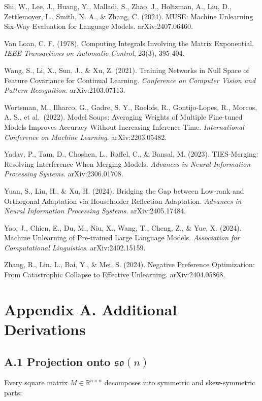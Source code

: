 \documentclass[
]{article}
\begin{document}
Shi, W., Lee, J., Huang, Y., Malladi, S., Zhao, J., Holtzman, A., Liu, D., Zettlemoyer, L., Smith, N. A., \& Zhang, C. (2024). MUSE: Machine Unlearning Six-Way Evaluation for Language Models. arXiv:2407.06460.

Van Loan, C. F. (1978). Computing Integrals Involving the Matrix Exponential. \emph{IEEE Transactions on Automatic Control}, 23(3), 395-404.

Wang, S., Li, X., Sun, J., \& Xu, Z. (2021). Training Networks in Null Space of Feature Covariance for Continual Learning. \emph{Conference on Computer Vision and Pattern Recognition}. arXiv:2103.07113.

Wortsman, M., Ilharco, G., Gadre, S. Y., Roelofs, R., Gontijo-Lopes, R., Morcos, A. S., et al.~(2022). Model Soups: Averaging Weights of Multiple Fine-tuned Models Improves Accuracy Without Increasing Inference Time. \emph{International Conference on Machine Learning}. arXiv:2203.05482.

Yadav, P., Tam, D., Choshen, L., Raffel, C., \& Bansal, M. (2023). TIES-Merging: Resolving Interference When Merging Models. \emph{Advances in Neural Information Processing Systems}. arXiv:2306.01708.

Yuan, S., Liu, H., \& Xu, H. (2024). Bridging the Gap between Low-rank and Orthogonal Adaptation via Householder Reflection Adaptation. \emph{Advances in Neural Information Processing Systems}. arXiv:2405.17484.

Yao, J., Chien, E., Du, M., Niu, X., Wang, T., Cheng, Z., \& Yue, X. (2024). Machine Unlearning of Pre-trained Large Language Models. \emph{Association for Computational Linguistics}. arXiv:2402.15159.

Zhang, R., Lin, L., Bai, Y., \& Mei, S. (2024). Negative Preference Optimization: From Catastrophic Collapse to Effective Unlearning. arXiv:2404.05868.

\section{Appendix A. Additional Derivations}\label{appendix-a.-additional-derivations}

\subsection{\texorpdfstring{A.1 Projection onto \(\mathfrak{so}(n)\)}{A.1 Projection onto \textbackslash mathfrak\{so\}(n)}}\label{a.1-projection-onto-mathfrakson}

Every square matrix \(M\in\mathbb{R}^{n\times n}\) decomposes into symmetric and skew-symmetric parts:
\end{document}
